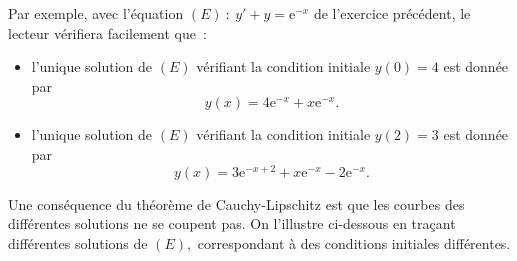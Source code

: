 \documentclass[10pt]{article}
\begin{document}
\medskip

Par exemple, avec l'équation $(E)~:~ y'+y=\text{e}^{-x}$ de l'exercice précédent, le lecteur vérifiera facilement que~:

\begin{itemize}
\item[\textbullet] l'unique solution de $(E)$ vérifiant la condition initiale $y(0)=4$ est donnée par
\[y(x)=4\text{e}^{-x}+x\text{e}^{-x}.\]
\item[\textbullet] l'unique solution de $(E)$ vérifiant la condition initiale $y(2)=3$ est donnée par
\[y(x)=3\text{e}^{-x+2}+x\text{e}^{-x}-2\text{e}^{-x}.\]
\end{itemize}

\medskip

Une conséquence du théorème de Cauchy-Lipschitz est que les courbes des différentes solutions ne se coupent pas. On l'illustre ci-dessous en traçant différentes solutions de $(E),$ correspondant à des conditions initiales différentes.
\end{document}
